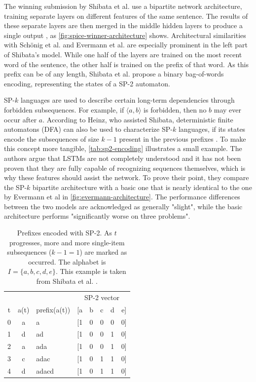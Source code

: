 The winning submission by Shibata et al. use a bipartite network architecture, training separate layers on different features of the same sentence. The results of these separate layers are then merged in the middle hidden layers to produce a single output \cite{shibata2016bipartite}, as \autoref{fig:spice-winner-architecture} shows. Architectural similarities with Schönig et al. and Evermann et al. are especially prominent in the left part of Shibata's model.
While one half of the layers are trained on the most recent word of the sentence, the other half is trained on the prefix of that word. As this prefix can be of any length, Shibata et al. propose a binary bag-of-words encoding, representing the states of a SP-2 automaton.

SP-$k$ languages are used to describe certain long-term dependencies through forbidden subsequences. For example, if $\langle a,b \rangle$ is forbidden, then no $b$ may ever occur after $a$. According to Heinz, who assisted Shibata, deterministic finite automatons (DFA) can also be used to characterize SP-$k$ languages, if its states encode the subsequences of size $k-1$  present in the previous prefixes \cite{heinz2010estimatingSP}. To make this concept more tangible, \autoref{tab:sp2-encoding} illustrates a small example. The authors argue that LSTMs are not completely understood and it has not been proven that they are fully capable of recognizing sequences themselves, which is why these features should assist the network. To prove their point, they compare the SP-$k$ bipartite architecture with a basic one that is nearly identical to the one by Evermann et al in \autoref{fig:evermann-architecture}. The performance differences between the two models are acknowledged as generally "slight", while the basic architecture performs "significantly worse on three problems".\\

\begin{table}[!htb]
    \centering
    \begin{tabular}{cclccccc}
        \hline
          &      &              & \multicolumn{5}{c}{SP-2 vector}\\
        t & a(t) & prefix(a(t)) & [a & b & c & d & e]\\
        \hline
        0 & a    & a            & [1 & 0 & 0 & 0 & 0]\\
        1 & d    & ad           & [1 & 0 & 0 & 1 & 0]\\
        2 & a    & ada          & [1 & 0 & 0 & 1 & 0]\\
        3 & c    & adac         & [1 & 0 & 1 & 1 & 0]\\
        4 & d    & adacd        & [1 & 0 & 1 & 1 & 0]\\
        \hline
    \end{tabular}
    \caption{Prefixes encoded with SP-2. As $t$ progresses, more and more single-item subsequences ($k-1=1$) are marked as occurred. The alphabet is $I=\{a,b,c,d,e\}$. This example is taken from Shibata et al.  \cite{shibata2016bipartite}.}
    \label{tab:sp2-encoding}
\end{table}

